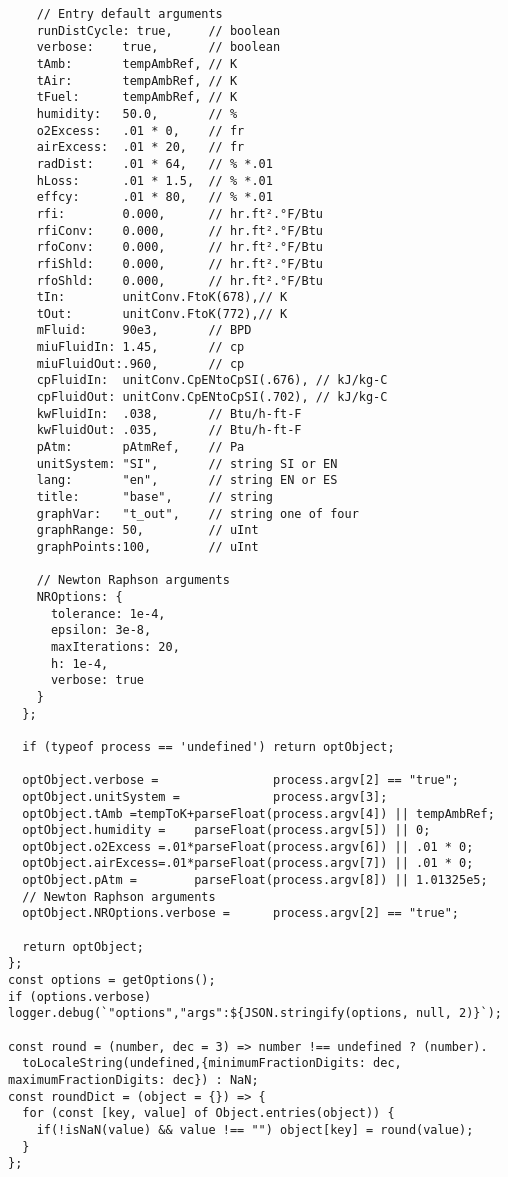 \begin{verbatim}
    // Entry default arguments
    runDistCycle: true,     // boolean
    verbose:    true,       // boolean
    tAmb:       tempAmbRef, // K
    tAir:       tempAmbRef, // K
    tFuel:      tempAmbRef, // K
    humidity:   50.0,       // %
    o2Excess:   .01 * 0,    // fr
    airExcess:  .01 * 20,   // fr
    radDist:    .01 * 64,   // % *.01
    hLoss:      .01 * 1.5,  // % *.01
    effcy:      .01 * 80,   // % *.01
    rfi:        0.000,      // hr.ft².°F/Btu
    rfiConv:    0.000,      // hr.ft².°F/Btu
    rfoConv:    0.000,      // hr.ft².°F/Btu
    rfiShld:    0.000,      // hr.ft².°F/Btu
    rfoShld:    0.000,      // hr.ft².°F/Btu
    tIn:        unitConv.FtoK(678),// K
    tOut:       unitConv.FtoK(772),// K
    mFluid:     90e3,       // BPD
    miuFluidIn: 1.45,       // cp
    miuFluidOut:.960,       // cp
    cpFluidIn:  unitConv.CpENtoCpSI(.676), // kJ/kg-C
    cpFluidOut: unitConv.CpENtoCpSI(.702), // kJ/kg-C 
    kwFluidIn:  .038,       // Btu/h-ft-F
    kwFluidOut: .035,       // Btu/h-ft-F
    pAtm:       pAtmRef,    // Pa
    unitSystem: "SI",       // string SI or EN
    lang:       "en",       // string EN or ES
    title:      "base",     // string
    graphVar:   "t_out",    // string one of four
    graphRange: 50,         // uInt
    graphPoints:100,        // uInt
  
    // Newton Raphson arguments
    NROptions: {
      tolerance: 1e-4,
      epsilon: 3e-8,
      maxIterations: 20,
      h: 1e-4,
      verbose: true
    }
  };
  
  if (typeof process == 'undefined') return optObject;

  optObject.verbose =                process.argv[2] == "true";
  optObject.unitSystem =             process.argv[3];
  optObject.tAmb =tempToK+parseFloat(process.argv[4]) || tempAmbRef;
  optObject.humidity =    parseFloat(process.argv[5]) || 0;
  optObject.o2Excess =.01*parseFloat(process.argv[6]) || .01 * 0;
  optObject.airExcess=.01*parseFloat(process.argv[7]) || .01 * 0;
  optObject.pAtm =        parseFloat(process.argv[8]) || 1.01325e5;
  // Newton Raphson arguments
  optObject.NROptions.verbose =      process.argv[2] == "true";

  return optObject;
};
const options = getOptions();
if (options.verbose) logger.debug(`"options","args":${JSON.stringify(options, null, 2)}`);

const round = (number, dec = 3) => number !== undefined ? (number).
  toLocaleString(undefined,{minimumFractionDigits: dec, maximumFractionDigits: dec}) : NaN;
const roundDict = (object = {}) => {
  for (const [key, value] of Object.entries(object)) {
    if(!isNaN(value) && value !== "") object[key] = round(value);
  }
};


\end{verbatim}
